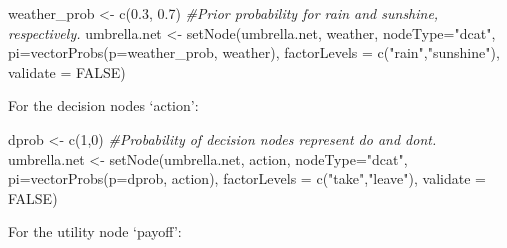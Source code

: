 \documentclass[
]{article}
\newenvironment{Shaded}{\begin{snugshade}}{\end{snugshade}}
\newcommand{\AttributeTok}[1]{\textcolor[rgb]{0.77,0.63,0.00}{#1}}
\newcommand{\CommentTok}[1]{\textcolor[rgb]{0.56,0.35,0.01}{\textit{#1}}}
\newcommand{\ConstantTok}[1]{\textcolor[rgb]{0.00,0.00,0.00}{#1}}
\newcommand{\DecValTok}[1]{\textcolor[rgb]{0.00,0.00,0.81}{#1}}
\newcommand{\FloatTok}[1]{\textcolor[rgb]{0.00,0.00,0.81}{#1}}
\newcommand{\FunctionTok}[1]{\textcolor[rgb]{0.00,0.00,0.00}{#1}}
\newcommand{\NormalTok}[1]{#1}
\newcommand{\OtherTok}[1]{\textcolor[rgb]{0.56,0.35,0.01}{#1}}
\newcommand{\StringTok}[1]{\textcolor[rgb]{0.31,0.60,0.02}{#1}}
\begin{document}
\begin{Shaded}
\begin{Highlighting}[]
\NormalTok{weather\_prob }\OtherTok{\textless{}{-}} \FunctionTok{c}\NormalTok{(}\FloatTok{0.3}\NormalTok{, }\FloatTok{0.7}\NormalTok{) }\CommentTok{\#Prior probability for rain and sunshine, respectively.}
\NormalTok{umbrella.net }\OtherTok{\textless{}{-}} \FunctionTok{setNode}\NormalTok{(umbrella.net, weather, }\AttributeTok{nodeType=}\StringTok{"dcat"}\NormalTok{, }\AttributeTok{pi=}\FunctionTok{vectorProbs}\NormalTok{(}\AttributeTok{p=}\NormalTok{weather\_prob, weather), }\AttributeTok{factorLevels =} \FunctionTok{c}\NormalTok{(}\StringTok{"rain"}\NormalTok{,}\StringTok{"sunshine"}\NormalTok{), }\AttributeTok{validate =} \ConstantTok{FALSE}\NormalTok{)}
\end{Highlighting}
\end{Shaded}

For the decision nodes `action':

\begin{Shaded}
\begin{Highlighting}[]
\NormalTok{dprob }\OtherTok{\textless{}{-}} \FunctionTok{c}\NormalTok{(}\DecValTok{1}\NormalTok{,}\DecValTok{0}\NormalTok{) }\CommentTok{\#Probability of decision nodes represent do and don\textquotesingle{}t.}
\NormalTok{umbrella.net }\OtherTok{\textless{}{-}} \FunctionTok{setNode}\NormalTok{(umbrella.net, action, }\AttributeTok{nodeType=}\StringTok{"dcat"}\NormalTok{, }\AttributeTok{pi=}\FunctionTok{vectorProbs}\NormalTok{(}\AttributeTok{p=}\NormalTok{dprob, action), }\AttributeTok{factorLevels =} \FunctionTok{c}\NormalTok{(}\StringTok{"take"}\NormalTok{,}\StringTok{"leave"}\NormalTok{), }\AttributeTok{validate =} \ConstantTok{FALSE}\NormalTok{)}
\end{Highlighting}
\end{Shaded}

For the utility node `payoff':
\end{document}
